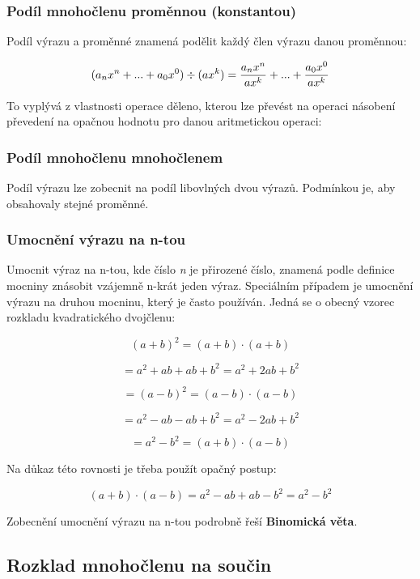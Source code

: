 \documentclass[11pt]{article}
\begin{document}
\subsubsection{Podíl mnohočlenu proměnnou (konstantou)}

Podíl výrazu a proměnné znamená podělit každý člen výrazu danou proměnnou:

$$ (a_{n}x^{n}+...+a_0x^{0}) \div (ax^{k}) = {{a_nx^{n}}\over{ax^{k}}}+...+{{a_{0}x^{0}}\over{ax^{k}}} $$

To vyplývá z vlastnosti operace děleno, kterou lze převést na operaci násobení převedení na opačnou hodnotu pro danou aritmetickou operaci:
\begin{center}
\end{center}
\subsubsection{Podíl mnohočlenu mnohočlenem}

Podíl výrazu lze zobecnit na podíl libovlných dvou výrazů. Podmínkou je, aby obsahovaly stejné proměnné.

\subsubsection{Umocnění výrazu na n-tou}

Umocnit výraz na n-tou, kde číslo {\it n} je přirozené číslo, znamená podle definice mocniny znásobit vzájemně n-krát jeden výraz. Speciálním případem je umocnění výrazu na druhou mocninu, který je často používán. Jedná se o obecný vzorec rozkladu kvadratického dvojčlenu:


$$ (a + b)^2 = (a + b) \cdot (a + b) $$

$$=a^2 + ab + ab + b^2 = a^2 +2ab +b^2 $$


$$ =(a-b)^2 = (a-b) \cdot (a-b) $$

$$= a^2 -ab -ab +b^2 = a^2 -2ab + b^2 $$

$$ = a^2-b^2 = (a + b) \cdot (a-b) $$

Na důkaz této rovnosti je třeba použít opačný postup:

$$ (a + b) \cdot (a-b) = a^2 -ab +ab -b^2 = a^2-b^2 $$

Zobecnění umocnění výrazu na n-tou podrobně řeší {\bf Binomická věta}.

\subsection{Rozklad mnohočlenu na součin}
\end{document}
